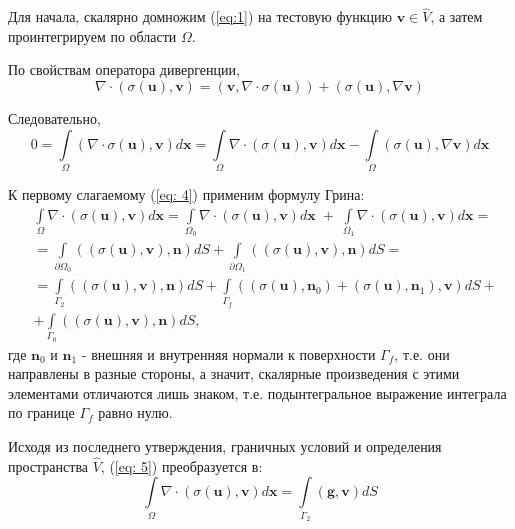 \documentclass[a4paper, 14pt]{extreport}
\begin{document}
Для начала, скалярно домножим (\ref{eq:1}) на тестовую функцию $\textbf{v} \in \hat{V}$, 
а затем проинтегрируем по области $\Omega$.

По свойствам оператора дивергенции,
\begin{equation}
	\label{eq: 3}
	\nabla\!\cdot\!(\sigma(\textbf{u}), \textbf{v}) = (\textbf{v}, \nabla\!\cdot\!\sigma(\textbf{u})) +
		(\sigma(\textbf{u}), \nabla\textbf{v})
\end{equation}

Следовательно,
\begin{equation}
	\label{eq: 4}
	0 = \int\limits_\Omega{(\nabla\!\cdot\!\sigma(\textbf{u}), \textbf{v})}d\textbf{x} = 
		\int\limits_\Omega{\nabla\!\cdot\!(\sigma(\textbf{u}), \textbf{v})}d\textbf{x} - 
		\int\limits_\Omega{(\sigma(\textbf{u}), \nabla \textbf{v})}d\textbf{x}
\end{equation}

К первому слагаемому (\ref{eq: 4}) применим формулу Грина:
\begin{equation}
	\label{eq: 5}
	\begin{aligned}
		& \int\limits_\Omega{\nabla\!\cdot\!(\sigma(\textbf{u}), \textbf{v})}d\textbf{x} = 
		\int\limits_{\Omega_0}{\nabla\!\cdot\!(\sigma(\textbf{u}), \textbf{v})}d\textbf{x} \; +  \;
		\int\limits_{\Omega_1}{\nabla\!\cdot\!(\sigma(\textbf{u}), \textbf{v})}d\textbf{x} = \\
		& = \int\limits_{\partial\Omega_0}{((\sigma(\textbf{u}), \textbf{v}), \textbf{n})}dS + 
		\int\limits_{\partial\Omega_1}{((\sigma(\textbf{u}), \textbf{v}), \textbf{n})}dS = \\
		& = \int\limits_{\Gamma_2}{((\sigma(\textbf{u}), \textbf{v}), \textbf{n})}dS + 
		\int\limits_{\Gamma_f}{((\sigma(\textbf{u}), \textbf{n}_0) + (\sigma(\textbf{u}), \textbf{n}_1), \textbf{v})}dS + \\
		& + \int\limits_{\Gamma_0}{((\sigma(\textbf{u}), \textbf{v}), \textbf{n})}dS,
	\end{aligned}
\end{equation}
где $\textbf{n}_0$ и $\textbf{n}_1$ - внешняя и внутренняя нормали к поверхности $\Gamma_f$,
т.е. они направлены в разные стороны, а значит, скалярные произведения с этими элементами 
отличаются лишь знаком, т.е. подынтегральное выражение интеграла по границе $\Gamma_f$ 
равно нулю.

Исходя из последнего утверждения, граничных условий и определения пространства $\hat{V}$,
(\ref{eq: 5}) преобразуется в:
\begin{equation}
	\label{eq: 6}
	\int\limits_\Omega{\nabla\!\cdot\!(\sigma(\textbf{u}), \textbf{v})}d\textbf{x} = 
	\int\limits_{\Gamma_2}{(\textbf{g}, \textbf{v})}dS
\end{equation}
\end{document}
